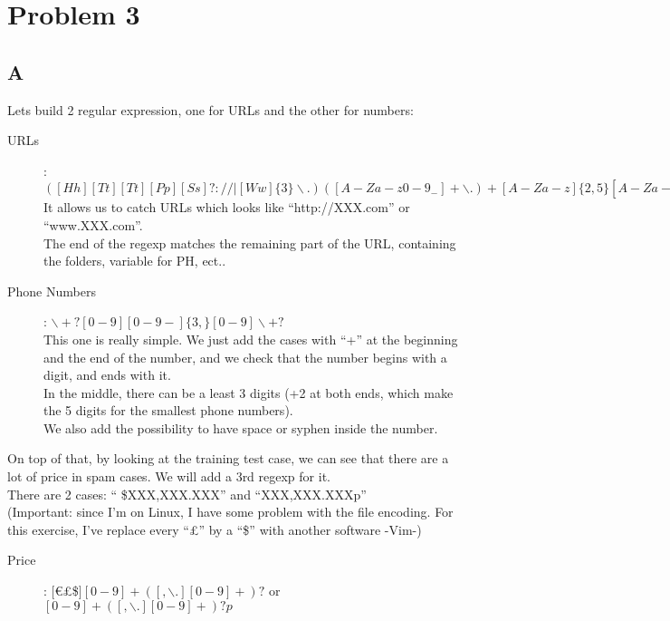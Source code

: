 \documentclass{article}
\begin{document}
    \section{Problem 3}
        \subsection{A}
            Lets build 2 regular expression, one for URLs and the other for numbers:
            \begin{description}
                \item[URLs]: $([Hh][Tt][Tt][Pp][Ss]?://|[Ww]\{3\}\backslash .)([A-Za-z0-9_ -]+\backslash .)+[A-Za-z]\{2,5\}[A-Za-z0-9/_? = -]*$\\
                    It allows us to catch URLs which looks like ``http://XXX.com'' or ``www.XXX.com''.\\
                    The end of the regexp matches the remaining part of the URL, containing the folders, variable for PH, ect..
                \item[Phone Numbers]: $\backslash+?[0-9][0-9 -]\{3,\}[0-9]\backslash+?$\\
                    This one is really simple. We just add the cases with ``+'' at the beginning and the end of the number, and we check that the number begins with a digit, and ends with it.\\
                    In the middle, there can be a least 3 digits (+2 at both ends, which make the 5 digits for the smallest phone numbers).\\
                    We also add the possibility to have space or syphen inside the number.
            \end{description}
            On top of that, by looking at the training test case, we can see that there are a lot of price in spam cases. We will add a 3rd regexp for it.\\
            There are 2 cases: `` \$XXX,XXX.XXX'' and ``XXX,XXX.XXXp''\\
            (Important: since I'm on Linux, I have some problem with the file encoding. For this exercise, I've replace every ``£'' by a ``\$'' with another software -Vim-)
            \begin{description}
                \item[Price]: $[$\euro£\$$][0-9]+([,\backslash.][0-9]+)?$ or $[0-9]+([,\backslash.][0-9]+)?p$
            \end{description}
\end{document}
